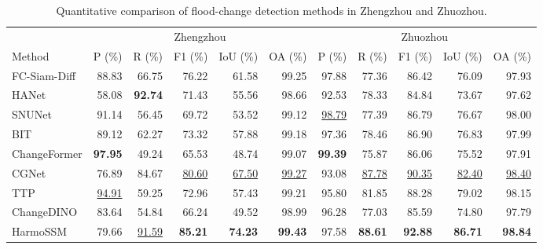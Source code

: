 \begin{table}[htbp]
\centering
\captionsetup{name=Table}
\caption{Quantitative comparison of flood-change detection methods in Zhengzhou and Zhuozhou.}
\label{tab:main_comparison}
\small
\setlength{\tabcolsep}{2pt}
\renewcommand{\arraystretch}{1.1}
\begin{tabular*}{\linewidth}{@{\extracolsep{\fill}}l*{10}{r}@{}}
\toprule
& \multicolumn{5}{c}{Zhengzhou} & \multicolumn{5}{c}{Zhuozhou} \\
\cmidrule(lr){2-6}\cmidrule(lr){7-11}
Method & P (\%) & R (\%) & F1 (\%) & IoU (\%) & OA (\%) & P (\%) & R (\%) & F1 (\%) & IoU (\%) & OA (\%) \\
\midrule
FC-Siam-Diff & 88.83 & 66.75 & 76.22 & 61.58 & 99.25 & 97.88 & 77.36 & 86.42 & 76.09 & 97.93 \\
HANet & 58.08 & \textbf{92.74} & 71.43 & 55.56 & 98.66 & 92.53 & 78.33 & 84.84 & 73.67 & 97.62 \\
SNUNet & 91.14 & 56.45 & 69.72 & 53.52 & 99.12 & \underline{98.79} & 77.39 & 86.79 & 76.67 & 98.00 \\
BIT & 89.12 & 62.27 & 73.32 & 57.88 & 99.18 & 97.36 & 78.46 & 86.90 & 76.83 & 97.99 \\
ChangeFormer & \textbf{97.95} & 49.24 & 65.53 & 48.74 & 99.07 & \textbf{99.39} & 75.87 & 86.06 & 75.52 & 97.91 \\
CGNet & 76.89 & 84.67 & \underline{80.60} & \underline{67.50} & \underline{99.27} & 93.08 & \underline{87.78} & \underline{90.35} & \underline{82.40} & \underline{98.40} \\
TTP & \underline{94.91} & 59.25 & 72.96 & 57.43 & 99.21 & 95.80 & 81.85 & 88.28 & 79.02 & 98.15 \\
ChangeDINO & 83.64 & 54.84 & 66.24 & 49.52 & 98.99 & 96.28 & 77.03 & 85.59 & 74.80 & 97.79 \\
HarmoSSM & 79.66 & \underline{91.59} & \textbf{85.21} & \textbf{74.23} & \textbf{99.43} & 97.58 & \textbf{88.61} & \textbf{92.88} & \textbf{86.71} & \textbf{98.84} \\
\bottomrule
\end{tabular*}
\end{table}
